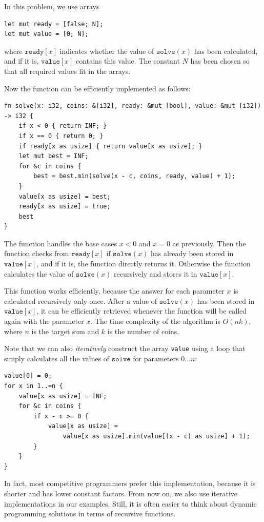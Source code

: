 In this problem, we use arrays
\begin{lstlisting}
let mut ready = [false; N];
let mut value = [0; N];
\end{lstlisting}

where $\texttt{ready}[x]$ indicates
whether the value of $\texttt{solve}(x)$ has been calculated,
and if it is, $\texttt{value}[x]$
contains this value.
The constant $N$ has been chosen so
that all required values fit in the arrays.

Now the function can be efficiently
implemented as follows:

\begin{lstlisting}
fn solve(x: i32, coins: &[i32], ready: &mut [bool], value: &mut [i32]) -> i32 {
    if x < 0 { return INF; }
    if x == 0 { return 0; }
    if ready[x as usize] { return value[x as usize]; }
    let mut best = INF;
    for &c in coins {
        best = best.min(solve(x - c, coins, ready, value) + 1);
    }
    value[x as usize] = best;
    ready[x as usize] = true;
    best
}
\end{lstlisting}

The function handles the base cases
$x<0$ and $x=0$ as previously.
Then the function checks from
$\texttt{ready}[x]$ if
$\texttt{solve}(x)$ has already been stored
in $\texttt{value}[x]$,
and if it is, the function directly returns it.
Otherwise the function calculates the value
of $\texttt{solve}(x)$
recursively and stores it in $\texttt{value}[x]$.

This function works efficiently,
because the answer for each parameter $x$
is calculated recursively only once.
After a value of $\texttt{solve}(x)$ has been stored in $\texttt{value}[x]$,
it can be efficiently retrieved whenever the
function will be called again with the parameter $x$.
The time complexity of the algorithm is $O(nk)$,
where $n$ is the target sum and $k$ is the number of coins.

Note that we can also \emph{iteratively}
construct the array \texttt{value} using
a loop that simply calculates all the values
of $\texttt{solve}$ for parameters $0 \ldots n$:
\begin{lstlisting}
value[0] = 0;
for x in 1..=n {
    value[x as usize] = INF;
    for &c in coins {
        if x - c >= 0 {
            value[x as usize] =
                value[x as usize].min(value[(x - c) as usize] + 1);
        }
    }
}
\end{lstlisting}

In fact, most competitive programmers prefer this
implementation, because it is shorter and has
lower constant factors.
From now on, we also use iterative implementations
in our examples.
Still, it is often easier to think about
dynamic programming solutions
in terms of recursive functions.


